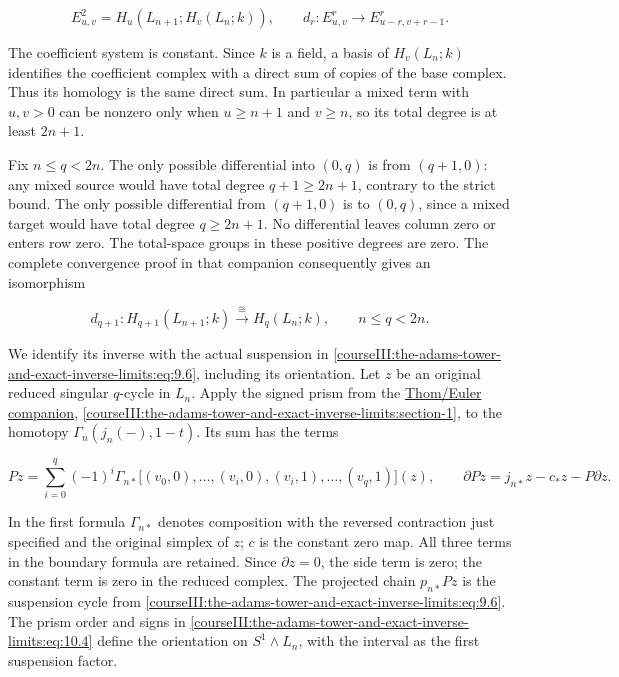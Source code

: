 \begin{equation}
E^2_{u,v}=H_u(L_{n+1};H_v(L_n;k)),
 \qquad d_r:E^r_{u,v}\to E^r_{u-r,v+r-1}.
 \label{courseIII:the-adams-tower-and-exact-inverse-limits:eq:10.2}
\end{equation}

The coefficient system is constant. Since \(k\) is a field, a basis of \(H_v(L_n;k)\) identifies the coefficient complex with a direct sum of copies of the base complex. Thus its homology is the same direct sum. In particular a mixed term with \(u,v>0\) can be nonzero only when \(u\geq n+1\) and \(v\geq n\), so its total degree is at least \(2n+1\).

Fix \(n\leq q<2n\). The only possible differential into \((0,q)\) is from \((q+1,0)\): any mixed source would have total degree \(q+1\geq2n+1\), contrary to the strict bound. The only possible differential from \((q+1,0)\) is to \((0,q)\), since a mixed target would have total degree \(q\geq2n+1\). No differential leaves column zero or enters row zero. The total-space groups in these positive degrees are zero. The complete convergence proof in that companion consequently gives an isomorphism

\begin{equation}
d_{q+1}:H_{q+1}(L_{n+1};k)
          \xrightarrow{\cong}H_q(L_n;k),
             \qquad n\leq q<2n.
 \label{courseIII:the-adams-tower-and-exact-inverse-limits:eq:10.3}
\end{equation}

We identify its inverse with the actual suspension in \eqref{courseIII:the-adams-tower-and-exact-inverse-limits:eq:9.6}, including its orientation. Let \(z\) be an original reduced singular \(q\)-cycle in \(L_n\). Apply the signed prism from the \href{https://github.com/KokunoYumeto/open-math-courses/blob/98715557b25d715076184ec098089ebae34ea9f6/docs/courses/CG-S6/src/thom-euler-for-lesson11.md}{Thom/Euler companion}, \cref{courseIII:the-adams-tower-and-exact-inverse-limits:section-1}, to the homotopy \(\Gamma_n(j_n(-),1-t)\). Its sum has the terms

\begin{equation}
Pz=\sum_{i=0}^{q}(-1)^i
  \Gamma_{n*}\bigl[
    (v_0,0),\ldots,(v_i,0),(v_i,1),\ldots,(v_q,1)
   \bigr](z),
 \qquad
 \partial Pz=j_{n*}z-c_*z-P\partial z.
 \label{courseIII:the-adams-tower-and-exact-inverse-limits:eq:10.4}
\end{equation}

In the first formula \(\Gamma_{n*}\) denotes composition with the reversed contraction just specified and the original simplex of \(z\); \(c\) is the constant zero map. All three terms in the boundary formula are retained. Since \(\partial z=0\), the side term is zero; the constant term is zero in the reduced complex. The projected chain \(p_{n*}Pz\) is the suspension cycle from \eqref{courseIII:the-adams-tower-and-exact-inverse-limits:eq:9.6}. The prism order and signs in \eqref{courseIII:the-adams-tower-and-exact-inverse-limits:eq:10.4} define the orientation on \(S^1\wedge L_n\), with the interval as the first suspension factor.

